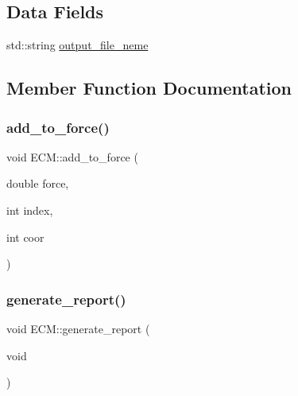 \subsection*{Data Fields}
\begin{DoxyCompactItemize}
\item 
std\+::string \mbox{\hyperlink{classECM_a14bf2404f3c94c4e4e372c5eb9fd70cf}{output\+\_\+file\+\_\+neme}}
\end{DoxyCompactItemize}


\subsection{Member Function Documentation}
\mbox{\label{classECM_a5ecaa9b089745b130c510aedbaea18e0}} 
\subsubsection{\texorpdfstring{add\_to\_force()}{add\_to\_force()}}
{\footnotesize\ttfamily void E\+C\+M\+::add\+\_\+to\+\_\+force (\begin{DoxyParamCaption}\item[{double}]{force,  }\item[{int}]{index,  }\item[{int}]{coor }\end{DoxyParamCaption})\hspace{0.3cm}{\ttfamily [inline]}}

\mbox{\label{classECM_ab6d157d62196d68af2437ffb3edc19fe}} 
\subsubsection{\texorpdfstring{generate\_report()}{generate\_report()}}
{\footnotesize\ttfamily void E\+C\+M\+::generate\+\_\+report (\begin{DoxyParamCaption}\item[{void}]{ }\end{DoxyParamCaption})}

\mbox{\label{classECM_ab8d8c6f37cbbf963cad176bfd5c45658}} 

